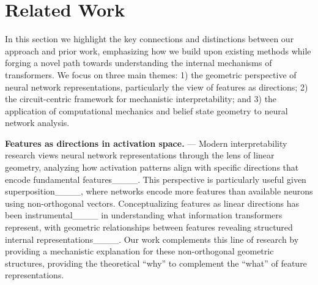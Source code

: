 \section{Related Work}
In this section we highlight the key connections and distinctions between our approach and prior work, emphasizing how we build upon existing methods while forging a novel path towards understanding the internal mechanisms of transformers. We 
focus on
three main themes: 1) the geometric perspective of neural network representations, particularly the view of features as directions; 2) the circuit-centric framework for mechanistic interpretability; and 3) the application of computational mechanics and belief state geometry to neural network analysis. 

\textbf{Features as directions in activation space.}
---
%
%
Modern interpretability research views neural network representations through the lens of linear geometry, analyzing how activation patterns align with specific directions that encode fundamental features____. This perspective is particularly useful given superposition____, where networks encode more features than available neurons using non-orthogonal vectors. Conceptualizing features as linear directions has been instrumental____ in understanding what information transformers represent, with geometric relationships between features revealing structured internal representations____. Our work complements this line of research by providing a mechanistic explanation for these non-orthogonal geometric structures, providing the theoretical ``why'' to complement the ``what'' of feature representations.

